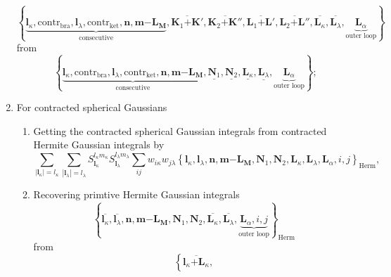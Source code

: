 \documentclass[a4paper,11pt,twoside,openright]{book}
\begin{document}
\begin{enumerate}
    \[
      \left\{\underbrace{\boldsymbol{l}_{\kappa},\text{contr}_{\text{bra}},%
        \boldsymbol{l}_{\lambda},\text{contr}_{\text{ket}},\boldsymbol{n},%
        \boldsymbol{m}\mathrm{-}\boldsymbol{L}_{\boldsymbol{M}}}_{\text{consecutive}},%
        \overline{\boldsymbol{K}_{1}\mathrm{+}\boldsymbol{K}'},%
        \overline{\boldsymbol{K}_{2}\mathrm{+}\boldsymbol{K}''},%
        \overline{\boldsymbol{L}_{1}\mathrm{+}\boldsymbol{L}'},%
        \overline{\boldsymbol{L}_{2}\mathrm{+}\boldsymbol{L}''},%
        \overline{\boldsymbol{L}_{\kappa}},\overline{\boldsymbol{L}_{\lambda}},%
        \underbrace{\boldsymbol{L}_{\alpha}}_{\text{outer loop}}\right\}
    \]
    from
    \[
      \left\{\underbrace{\boldsymbol{l}_{\kappa},\text{contr}_{\text{bra}},%
        \boldsymbol{l}_{\lambda},\text{contr}_{\text{ket}},\boldsymbol{n},%
        \boldsymbol{m}\mathrm{-}\boldsymbol{L}_{\boldsymbol{M}}}_{\text{consecutive}},%
        \underline{\boldsymbol{N}_{1}},\underline{\boldsymbol{N}_{2}},%
        \underline{\boldsymbol{L}_{\kappa}},\underline{\boldsymbol{L}_{\lambda}},%
        \underbrace{\boldsymbol{L}_{\alpha}}_{\text{outer loop}}\right\};
      \]
%
  \item For contracted spherical Gaussians
    \begin{enumerate}
      \item Getting the contracted spherical Gaussian integrals from contracted Hermite Gaussian integrals by
        \[
          \sum_{|\boldsymbol{l}_{\kappa}|=l_{\kappa}}\sum_{|\boldsymbol{l}_{\lambda}|=l_{\lambda}}%
          S^{l_{\kappa}m_{\kappa}}_{\boldsymbol{l}_{\kappa}}S^{l_{\lambda}m_{\lambda}}_{\boldsymbol{l}_{\lambda}}%
          \sum_{ij}w_{i\kappa}w_{j\lambda}%
          \left\{\boldsymbol{l}_{\kappa},\boldsymbol{l}_{\lambda},\boldsymbol{n},%
          \boldsymbol{m}\mathrm{-}\boldsymbol{L}_{\boldsymbol{M}},%
          \boldsymbol{N}_{1},\boldsymbol{N}_{2},\boldsymbol{L}_{\kappa},%
          \boldsymbol{L}_{\lambda},\boldsymbol{L}_{\alpha},i,j\right\}_{\text{Herm}},
        \]
      \item Recovering primtive Hermite Gaussian integrals
        \[
          \left\{\overline{\boldsymbol{l}_{\kappa}},\overline{\boldsymbol{l}_{\lambda}},%
          \boldsymbol{n},\boldsymbol{m}\mathrm{-}\boldsymbol{L}_{\boldsymbol{M}},%
          \boldsymbol{N}_{1},\boldsymbol{N}_{2},%
          \overline{\boldsymbol{L}_{\kappa}},\overline{\boldsymbol{L}_{\lambda}},%
          \underbrace{\boldsymbol{L}_{\alpha},i,j}_{\text{outer loop}}\right\}_{\text{Herm}}
        \]
        from
        \[
          \left\{\overline{\boldsymbol{l}_{\kappa}\mathrm{+}\boldsymbol{L}_{\kappa}},%
\]
\end{enumerate}
\end{enumerate}
\end{document}
